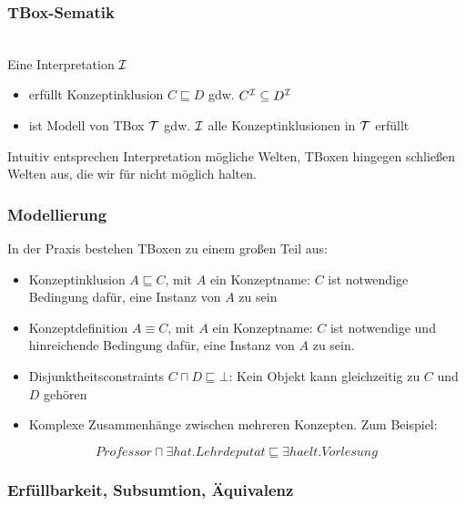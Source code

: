 \subsubsection{TBox-Sematik}\label{tboxsemantik}

\begin{definition} \\
Eine Interpretation $\mathcal{I}$
\begin{itemize}
\item
  erfüllt Konzeptinklusion $C \sqsubseteq D$ gdw.
  $C^{\mathcal{I}} \subseteq D^{\mathcal{I}}$
\item
  ist Modell von TBox $\mathcal{T}$ gdw. $\mathcal{I}$ alle Konzeptinklusionen in $\mathcal{T}$
  erfüllt
\end{itemize}
\end{definition}

Intuitiv entsprechen Interpretation mögliche Welten, TBoxen hingegen schließen Welten aus, die wir für nicht möglich halten.

\subsubsection{Modellierung}\label{modellierung}

In der Praxis bestehen TBoxen zu einem großen Teil aus:

\begin{itemize}
\item Konzeptinklusion $A \sqsubseteq C$, mit $A$ ein Konzeptname: $C$ ist notwendige Bedingung dafür, eine Instanz von $A$ zu sein
\item Konzeptdefinition $A \equiv C$, mit $A$ ein Konzeptname: $C$ ist notwendige und hinreichende Bedingung dafür, eine Instanz von $A$ zu sein.
\item Disjunktheitsconstraints $C \sqcap D \sqsubseteq \bot$: Kein Objekt kann gleichzeitig zu $C$ und $D$ gehören
\item Komplexe Zusammenhänge zwischen mehreren Konzepten. Zum Beispiel:
\end{itemize}

$$Professor \sqcap \exists hat.Lehrdeputat \sqsubseteq \exists haelt.Vorlesung$$

\subsubsection{Erfüllbarkeit, Subsumtion, Äquivalenz}\label{erfuxfcllbarkeit-subsumtion-uxe4quivalenz-1}

